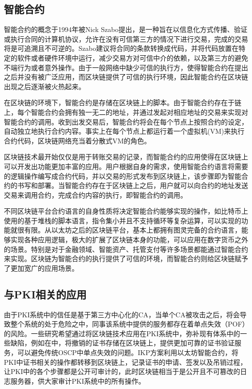 \subsection{智能合约}

智能合约的概念于1994年被Nick Szabo提出\supercite{szabo1996smart}，是一种旨在以信息化方式传播、验证或执行合同的计算机协议，允许在没有可信第三方的情况下进行交易，完成的交易将是可追溯且不可逆的。Szabo建议将合同的条款转换成代码，并将代码放置在特定的软件或者硬件环境中运行，减少交易方对可信中介的依赖，以及第三方的避免不端行为或者意外操作。由于一般网络中缺少可信的执行方，使得智能合约在提出之后并没有被广泛应用，而区块链提供了可信的执行环境，因此智能合约在区块链出现之后逐渐被火热起来。

在区块链的环境下，智能合约是存储在区块链上的脚本。由于智能合约存在于链上，每个智能合约会拥有独一无二的地址，并通过发起对相应地址的交易来实现对智能合约的调用。收到出发交易后，智能合约将会在每个节点上按照合约的设定，自动独立地执行合约内容。事实上在每个节点上都运行着一个虚拟机(VM)来执行合约代码，区块链网络充当着分散式VM的角色。

区块链技术最开始仅仅是用于转账交易的记录，而智能合约的应用使得在区块链上可以开发出功能更加丰富的应用。用户根据自身的需求，使用智能合约语言将需要的逻辑操作编写成合约代码，并以交易的形式发布到区块链上，该步骤即为智能合约的书写和部署。当智能合约存在于区块链上之后，用户就可以向合约的地址发送交易来调用合约，完成合约内容的执行，即智能合约的调用。


不同区块链平台合约语言的自身性质将决定智能合约能够实现的操作，如比特币上使用的基于堆栈的脚本语言，指令集小并且不支持循环等复杂运算，可以实现的功能就很有限。从以太坊之后的区块链平台，基本上都拥有图灵完备的合约语言，能够实现各种应用逻辑，极大的扩展了区块链本身的功能，可以应用在数字货币之外的场景。特别是对于金融领域、智能资产、托管支付等许多场景都能通过智能合约来实现。区块链为智能合约的执行提供了可信的环境，而智能合约则给区块链赋予了更加宽广的应用场景。



\subsection{与PKI相关的应用}




由于PKI系统中的信任是基于第三方中心化的CA，当单个CA被攻击之后，将会导致整个系统的处于危险之中，同事该系统中提供的服务都存在着单点失效（POF）的风险。一些研究希望通过将区块链技术应用在PKI系统中，弥补现有体系中的一些缺陷，例如在\parencite{baldi2017certificate}中，将撤销的证书存储在区块链上，提供更加可靠的证书验证服务，可以避免传统OSCP中单点失效的问题。IKP\supercite{matsumoto2016ikp}方案利用以太坊智能合约，将PKI中证书相关的操作都转移到区块链上，记录证书的申请、签发以及吊销过程，让PKI中的各个步骤都是公开可审计的，此时区块链相当于是公开且不可篡改的日志服务器，供大家审计PKI系统中的所有操作。

